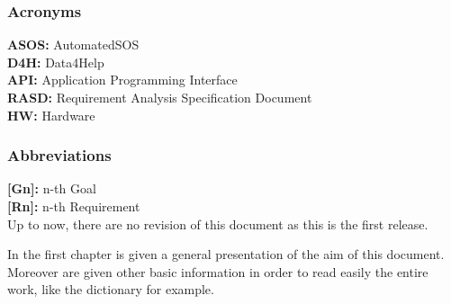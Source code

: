 {}
{}
{\color{Blue}\subsubsection{Acronyms}}
\textbf{ASOS:} AutomatedSOS\\
\textbf{D4H:} Data4Help\\
\textbf{API:} Application Programming Interface\\
\textbf{RASD:} Requirement Analysis Specification Document \\
\textbf{HW:} Hardware \\

{\color{Blue}\subsubsection{Abbreviations}}
\textbf{[Gn]:} n-th Goal\\
\textbf{[Rn]:} n-th Requirement\\

{}
Up to now, there are no revision of this document as this is the first release.

{}


{}
{}
In the first chapter is given a general presentation of the aim of this document. Moreover are given other basic information in order to read easily the entire work, like the dictionary for example.

